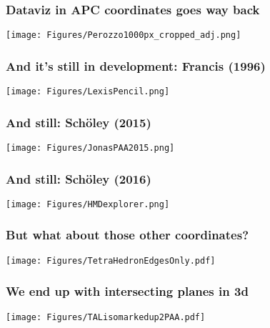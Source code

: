 \documentclass[20pt]{beamer}
\begin{document}

\begin{frame}
\frametitle{Dataviz in APC coordinates goes way back}
\begin{center}
\texttt{[image: Figures/Perozzo1000px\_cropped\_adj.png]}
\end{center}
\end{frame}

\begin{frame}
\frametitle{And it's still in development: Francis (1996)}
\begin{center}
\texttt{[image: Figures/LexisPencil.png]}
\end{center}
\end{frame}


\begin{frame}
\frametitle{And still: Sch{\"o}ley (2015)}
\begin{center}
\texttt{[image: Figures/JonasPAA2015.png]}
\end{center}
\end{frame}


\begin{frame}
\frametitle{And still: Sch{\"o}ley (2016)}
\begin{center}
\hspace*{-1.3cm}\texttt{[image: Figures/HMDexplorer.png]}
\end{center}
\end{frame}


\begin{frame}
\frametitle{But what about those other coordinates?}
\vspace{-4em}
\begin{center}
\texttt{[image: Figures/TetraHedronEdgesOnly.pdf]}
\end{center}
\end{frame}


\begin{frame}
\frametitle{We end up with intersecting planes in 3d}
\vspace{-4em}
\begin{center}
\texttt{[image: Figures/TALisomarkedup2PAA.pdf]}
\end{center}
\end{frame}
\end{document}

